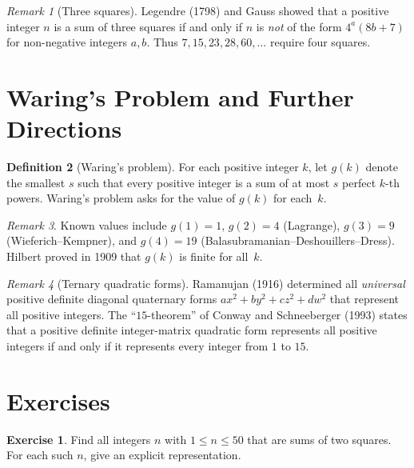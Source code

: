 \documentclass[12pt,a4paper,openany]{book}
\theoremstyle{definition}
\newtheorem{definition}{Definition}[chapter]
\newtheorem{exercise}{Exercise}[chapter]
\theoremstyle{plain}
\theoremstyle{remark}
\newtheorem{remark}[definition]{Remark}
\begin{document}
\begin{remark}[Three squares]\label{rem:three-sq}
Legendre (1798) and Gauss showed that a positive integer $n$ is a sum of three
squares if and only if $n$ is \emph{not} of the form $4^a(8b+7)$ for
non-negative integers $a,b$.  Thus $7, 15, 23, 28, 60, \ldots$ require four squares.
\end{remark}

\section{Waring's Problem and Further Directions}\label{sec:waring}

\begin{definition}[Waring's problem]\label{def:waring}
For each positive integer $k$, let $g(k)$ denote the smallest $s$ such that
every positive integer is a sum of at most $s$ perfect $k$-th powers.
Waring's problem asks for the value of $g(k)$ for each~$k$.
\end{definition}

\begin{remark}\label{rem:waring-values}
Known values include $g(1) = 1$, $g(2) = 4$ (Lagrange),
$g(3) = 9$ (Wieferich--Kempner), and $g(4) = 19$ (Balasubramanian--Deshouillers--Dress).
Hilbert proved in 1909 that $g(k)$ is finite for all~$k$.
\end{remark}

\begin{remark}[Ternary quadratic forms]\label{rem:ternary}
Ramanujan (1916) determined all \emph{universal}
positive definite diagonal quaternary forms $ax^2+by^2+cz^2+dw^2$ that represent
all positive integers.  The ``$15$-theorem'' of Conway and Schneeberger (1993)
states that a positive definite integer-matrix quadratic form represents
all positive integers if and only if it represents every integer from $1$ to $15$.
\end{remark}

\section{Exercises}\label{sec:ch7-exercises}

\begin{exercise}\label{exer:two-sq-100}
Find all integers $n$ with $1 \le n \le 50$ that are sums of two squares.
For each such $n$, give an explicit representation.
\end{exercise}
\end{document}
